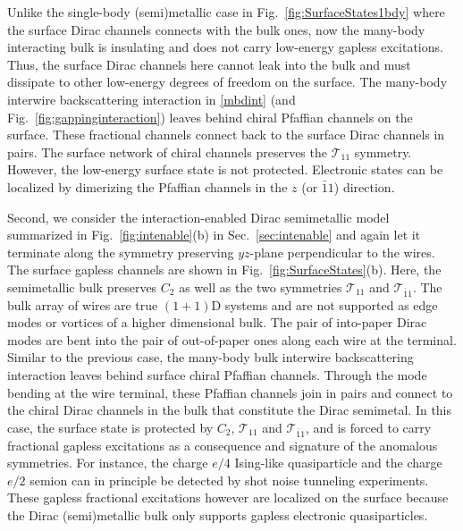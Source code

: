 Unlike the single-body (semi)metallic case in Fig.~\ref{fig:SurfaceStates1bdy} where the surface Dirac channels connects with the bulk ones, now the many-body interacting bulk is insulating and does not carry low-energy gapless excitations. Thus, the surface Dirac channels here cannot leak into the bulk and must dissipate to other low-energy degrees of freedom on the surface. The many-body interwire backscattering interaction in \eqref{mbdint} (and Fig.~\ref{fig:gappinginteraction}) leaves behind chiral Pfaffian channels on the surface. These fractional channels connect back to the surface Dirac channels in pairs. The surface network of chiral channels preserves the \AFTR $\mathcal{T}_{11}$ symmetry. However, the low-energy surface state is not protected. Electronic states can be localized by dimerizing the Pfaffian channels in the $z$ (or $\bar{1}1$) direction.

Second, we consider the interaction-enabled Dirac semimetallic model summarized in Fig.~\ref{fig:intenable}(b) in Sec.~\ref{sec:intenable} and again let it terminate along the symmetry preserving $yz$-plane perpendicular to the wires. The surface gapless channels are shown in Fig.~\ref{fig:SurfaceStates}(b). Here, the semimetallic bulk preserves $C_2$ as well as the two \AFTR symmetries $\mathcal{T}_{11}$ and $\mathcal{T}_{\bar{1}1}$. The bulk array of wires are true $(1+1)$D systems and are not supported as edge modes or vortices of a higher dimensional bulk. The pair of into-paper Dirac modes are bent into the pair of out-of-paper ones along each wire at the terminal. Similar to the previous case, the many-body bulk interwire backscattering interaction leaves behind surface chiral Pfaffian channels. Through the mode bending at the wire terminal, these Pfaffian channels join in pairs and connect to the chiral Dirac channels in the bulk that constitute the Dirac semimetal. In this case, the surface state is protected by $C_2$, $\mathcal{T}_{11}$ and $\mathcal{T}_{\bar{1}1}$, and is forced to carry fractional gapless excitations as a consequence and signature of the anomalous symmetries. For instance, the charge $e/4$ Ising-like quasiparticle and the charge $e/2$ semion can in principle be detected by shot noise tunneling experiments. These gapless fractional excitations however are localized on the surface because the Dirac (semi)metallic bulk only supports gapless electronic quasiparticles.
